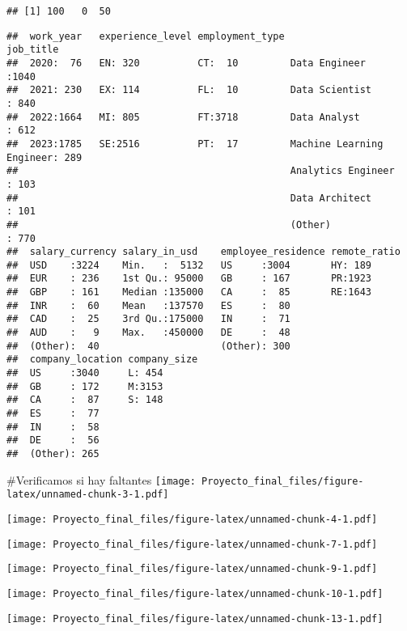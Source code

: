 \documentclass[
]{article}
\begin{document}
\begin{verbatim}
## [1] 100   0  50
\end{verbatim}

\begin{verbatim}
##  work_year   experience_level employment_type                     job_title   
##  2020:  76   EN: 320          CT:  10         Data Engineer            :1040  
##  2021: 230   EX: 114          FL:  10         Data Scientist           : 840  
##  2022:1664   MI: 805          FT:3718         Data Analyst             : 612  
##  2023:1785   SE:2516          PT:  17         Machine Learning Engineer: 289  
##                                               Analytics Engineer       : 103  
##                                               Data Architect           : 101  
##                                               (Other)                  : 770  
##  salary_currency salary_in_usd    employee_residence remote_ratio
##  USD    :3224    Min.   :  5132   US     :3004       HY: 189     
##  EUR    : 236    1st Qu.: 95000   GB     : 167       PR:1923     
##  GBP    : 161    Median :135000   CA     :  85       RE:1643     
##  INR    :  60    Mean   :137570   ES     :  80                   
##  CAD    :  25    3rd Qu.:175000   IN     :  71                   
##  AUD    :   9    Max.   :450000   DE     :  48                   
##  (Other):  40                     (Other): 300                   
##  company_location company_size
##  US     :3040     L: 454      
##  GB     : 172     M:3153      
##  CA     :  87     S: 148      
##  ES     :  77                 
##  IN     :  58                 
##  DE     :  56                 
##  (Other): 265
\end{verbatim}

\#Verificamos si hay faltantes
\texttt{[image: Proyecto\_final\_files/figure-latex/unnamed-chunk-3-1.pdf]}

\texttt{[image: Proyecto\_final\_files/figure-latex/unnamed-chunk-4-1.pdf]}

\texttt{[image: Proyecto\_final\_files/figure-latex/unnamed-chunk-7-1.pdf]}

\texttt{[image: Proyecto\_final\_files/figure-latex/unnamed-chunk-9-1.pdf]}

\texttt{[image: Proyecto\_final\_files/figure-latex/unnamed-chunk-10-1.pdf]}

\texttt{[image: Proyecto\_final\_files/figure-latex/unnamed-chunk-13-1.pdf]}
\end{document}
